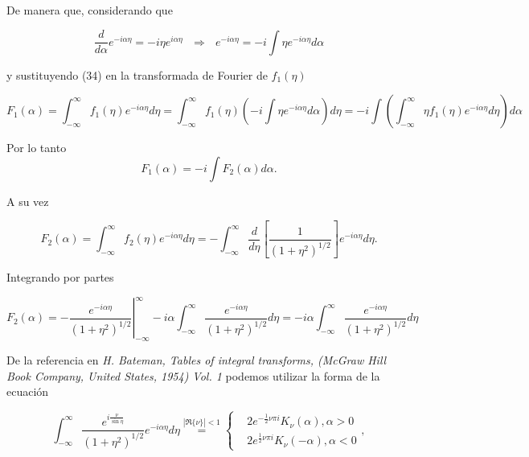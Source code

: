 \documentclass[a4paper,10pt]{article}
\begin{document}
De manera que, considerando que

\begin{equation}
\frac{d}{d\alpha}e^{-i\alpha\eta}=-i\eta e^{i\alpha\eta} \text{         $\Rightarrow$         } e^{-i\alpha\eta}=-i\int\eta e^{-i\alpha\eta}d\alpha
\end{equation}

y sustituyendo (34) en la transformada de Fourier de $f_1(\eta)$

\begin{equation*}
F_1(\alpha)	=\int_{-\infty}^{\infty} f_1(\eta) e^{-i\alpha\eta} d\eta
					=\int_{-\infty}^{\infty} f_1(\eta) \left( -i\int\eta e^{-i\alpha\eta}d\alpha\right) d\eta
					=-i \int \left( \int_{-\infty}^{\infty} \eta f_1(\eta) e^{-i\alpha\eta} d\eta \right) d\alpha
\end{equation*}

Por lo tanto
\begin{equation}
F_1(\alpha)=-i \int F_2(\alpha) d\alpha.
\end{equation}

A su vez

\begin{equation}
F_2(\alpha)	=\int_{-\infty}^{\infty} f_2(\eta) e^{-i\alpha\eta} d\eta
					=-\int_{-\infty}^{\infty} \frac{d}{d\eta}\left[\frac{1}{(1+\eta^2)^{1/2}}\right] e^{-i\alpha\eta} d\eta.
\end{equation}

Integrando por partes

\begin{equation*}
F_2(\alpha) = -\left. \frac{e^{-i\alpha\eta}}{(1+\eta^2)^{1/2}} \right|_{-\infty}^{\infty}-i\alpha \int_{-\infty}^{\infty} \frac{e^{-i\alpha\eta}}{(1+\eta^2)^{1/2}} d\eta=-i\alpha \int_{-\infty}^{\infty} \frac{e^{-i\alpha\eta}}{(1+\eta^2)^{1/2}} d\eta
\end{equation*}

De la referencia en \textsl{H. Bateman, Tables of integral transforms, (McGraw Hill Book Company, United States, 1954) Vol. 1} podemos utilizar la forma de la ecuación

\begin{equation}
\int_{-\infty}^{\infty} \frac{e^{i\frac{\nu}{\sin \eta}}}{(1+\eta^2)^{1/2}} e^{-i\alpha\eta} d\eta \overset{|\Re \{\nu\}|<1}{=} 
\left\{
\begin{aligned}
	&2e^{-\frac{1}{2}\nu \pi i}	K_{\nu}(\alpha), \alpha>0	\\
	&2e^{ \frac{1}{2}\nu \pi i}	K_{\nu}(-\alpha), \alpha<0
\end{aligned},
\right.
\end{equation}
\end{document}

